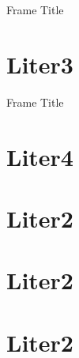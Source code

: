 \documentclass{beamer}
\begin{document}
\begin{frame}{Frame Title}
    
\end{frame}


\section{Liter3}
\begin{frame}{Frame Title}
    
\end{frame}

\section{Liter4}


\section{Liter2}

\section{Liter2}

\section{Liter2}
\end{document}
